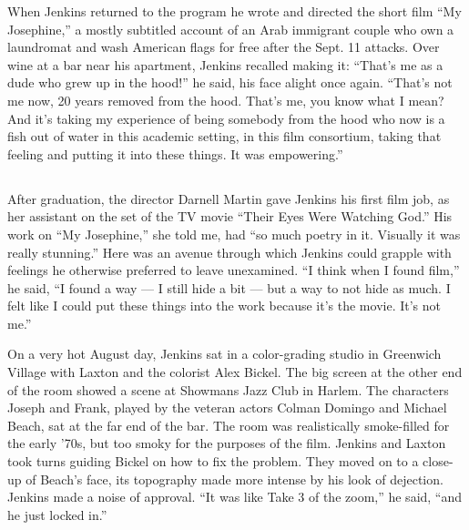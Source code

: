 When Jenkins returned to the program he wrote and directed the short
film ``My Josephine,'' a mostly subtitled account of an Arab immigrant
couple who own a laundromat and wash American flags for free after the
Sept. 11 attacks. Over wine at a bar near his apartment, Jenkins
recalled making it: ``That's me as a dude who grew up in the hood!'' he
said, his face alight once again. ``That's not me now, 20 years removed
from the hood. That's me, you know what I mean? And it's taking my
experience of being somebody from the hood who now is a fish out of
water in this academic setting, in this film consortium, taking that
feeling and putting it into these things. It was empowering.''

\hypertarget{-1}{%
\subsection{}\label{-1}}

After graduation, the director Darnell Martin gave Jenkins his first
film job, as her assistant on the set of the TV movie ``Their Eyes Were
Watching God.'' His work on ``My Josephine,'' she told me, had ``so much
poetry in it. Visually it was really stunning.'' Here was an avenue
through which Jenkins could grapple with feelings he otherwise preferred
to leave unexamined. ``I think when I found film,'' he said, ``I found a
way --- I still hide a bit --- but a way to not hide as much. I felt
like I could put these things into the work because it's the movie. It's
not me.''

On a very hot August day, Jenkins sat in a color-grading studio in
Greenwich Village with Laxton and the colorist Alex Bickel. The big
screen at the other end of the room showed a scene at Showmans Jazz Club
in Harlem. The characters Joseph and Frank, played by the veteran actors
Colman Domingo and Michael Beach, sat at the far end of the bar. The
room was realistically smoke-filled for the early '70s, but too smoky
for the purposes of the film. Jenkins and Laxton took turns guiding
Bickel on how to fix the problem. They moved on to a close-up of Beach's
face, its topography made more intense by his look of dejection. Jenkins
made a noise of approval. ``It was like Take 3 of the zoom,'' he said,
``and he just locked in.''

